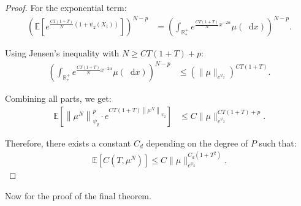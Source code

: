 \documentclass[11pt,a4paper]{article}
\newcommand{\RRP}{\mathbb{R}^+_*}
\newcommand{\E}[1]{\mathbb{E}\left[#1\right]}
\newcommand{\dd}{\mathop{}\!\mathrm{d}}
\begin{document}
\begin{proof}
    For the exponential term:
    \begin{align*}
        \left(\E{e^{\frac{C T(1 + T)}{N}(1 + \psi_2(X_1))}}\right)^{N-p} 
        &= \left(\int_{\RRP} e^{\frac{C T(1 + T)}{N} x^{-2\alpha}} \mu(\dd x) \right)^{N - p}.
    \end{align*}

    Using Jensen’s inequality with $N \geq C T(1 + T) + p$:
    \begin{align*}
        \left(\int_{\RRP} e^{\frac{C T(1 + T)}{N} x^{-2\alpha}} \mu(\dd x)\right)^{N - p} 
        &\leq \left(\|\mu\|_{e^{\psi_2}}\right)^{C T(1 + T)}.
    \end{align*}

    Combining all parts, we get:
    \begin{align*}
        \E{\left\|\mu^N\right\|_{\psi_q}^p \cdot e^{C T(1 + T)\left\|\mu^N\right\|_{\psi_2}}} 
        &\leq C \|\mu\|_{e^{\psi_2}}^{C T(1 + T) + p}.
    \end{align*}

    Therefore, there exists a constant $C_d$ depending on the degree of $P$ such that:
    \begin{align*}
        \E{C(T,\mu^N)} \leq C \|\mu\|_{e^{\psi_2}}^{C_d(1 + T^2)}.
    \end{align*}
\end{proof}
Now for the proof of the final theorem.
\end{document}
